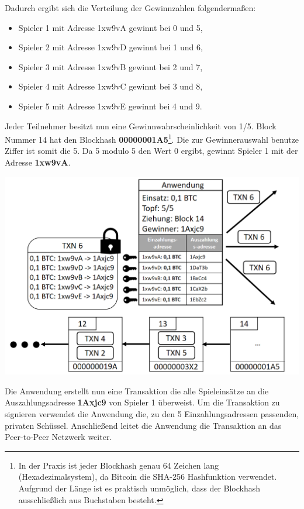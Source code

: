 \vspace{1cm}
Dadurch ergibt sich die Verteilung der Gewinnzahlen folgendermaßen:
\begin{itemize}
\item Spieler 1 mit Adresse 1xw9vA gewinnt bei 0 und 5,
\item Spieler 2 mit Adresse 1xw9vD gewinnt bei 1 und 6,
\item Spieler 3 mit Adresse 1xw9vB gewinnt bei 2 und 7,
\item Spieler 4 mit Adresse 1xw9vC gewinnt bei 3 und 8,
\item Spieler 5 mit Adresse 1xw9vE gewinnt bei 4 und 9.
\end{itemize}
Jeder Teilnehmer besitzt nun eine Gewinnwahrscheinlichkeit von 1/5. Block Nummer 14 hat den Blockhash \textbf{00000001A5}\footnote{In der Praxis ist jeder Blockhash genau 64 Zeichen lang (Hexadezimalsystem), da Bitcoin die SHA-256 Hashfunktion verwendet. Aufgrund der Länge ist es praktisch unmöglich, dass der Blockhash ausschließlich aus Buchstaben besteht.}. Die zur Gewinnerauswahl benutze Ziffer ist somit die 5. Da 5 modulo 5 den Wert 0 ergibt, gewinnt Spieler 1 mit der Adresse \textbf{1xw9vA}.

\vspace{1cm}
\begin{minipage}{0.55\textwidth}
\includegraphics[width=\textwidth]{Figures/konzept_btc/konzept11}
\centering
\decoRule
{}
\label{fig:konzept11}
\end{minipage}
\begin{minipage}{0.45\textwidth}
Die Anwendung erstellt nun eine Transaktion die alle Spieleinsätze an die Auszahlungsadresse \textbf{1Axjc9} von Spieler 1 überweist. Um die Transaktion zu signieren verwendet die Anwendung die, zu den 5 Einzahlungsadressen passenden, privaten Schüssel. Anschließend leitet die Anwendung die Transaktion an das Peer-to-Peer Netzwerk weiter.
\end{minipage}


